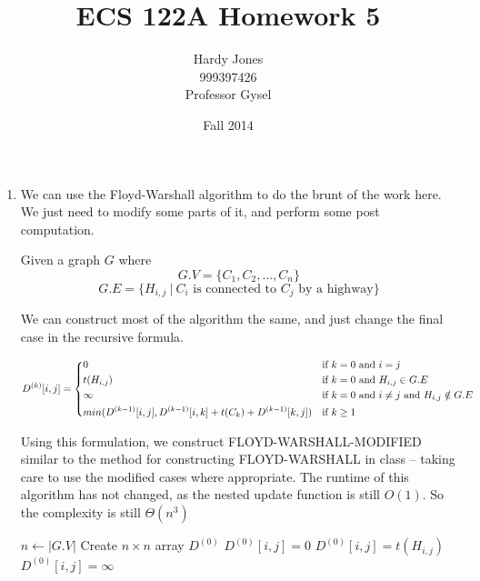 \documentclass[12pt,letterpaper]{article}
\title{ECS 122A Homework 5\vspace{-2ex}}
\author{Hardy Jones\\
        999397426\\
        Professor Gysel\vspace{-2ex}}
\date{Fall 2014}
\begin{document}
  \maketitle

  \begin{enumerate}
    \item
      We can use the Floyd-Warshall algorithm to do the brunt of the work here.
      We just need to modify some parts of it, and perform some post computation.

      Given a graph $G$ where
      \[
        G.V = \{C_1, C_2, \dots, C_n\}
      \]
      \[
        G.E = \{H_{i, j} \ | \ C_i \text{ is connected to } C_j \text{ by a highway}\}
      \]

      We can construct most of the algorithm the same,
      and just change the final case in the recursive formula.


      \[
        D^{(k)}[i, j] =
        \begin{dcases*}
          0           & if $k = 0$ and $i = j$ \\
          t(H_{i, j}) & if $k = 0$ and $H_{i, j} \in G.E$ \\
          \infty      & if $k = 0$ and $i \ne j$ and $H_{i, j} \notin G.E$ \\
          min(D^{(k-1)}[i, j], D^{(k-1)}[i, k] + t(C_k) + D^{(k-1)}[k, j]) & if $k \ge 1$
        \end{dcases*}
      \]

      Using this formulation, we construct FLOYD-WARSHALL-MODIFIED similar to the method for constructing FLOYD-WARSHALL in class -- taking care to use the modified cases where appropriate.
      The runtime of this algorithm has not changed, as the nested update function is still $O(1)$.
      So the complexity is still $\Theta(n^3)$

      \pagebreak

      \begin{algorithm}
        \begin{algorithmic}
            \State $n \gets |G.V|$
            \State Create $n \times n$ array $D^{(0)}$
                  \State $D^{(0)}[i, j] = 0$
                  \State $D^{(0)}[i, j] = t(H_{i, j})$
                \Else
                  \State $D^{(0)}[i, j] = \infty$
                \EndIf
              \EndFor
            \EndFor


\end{algorithmic}
\end{algorithm}
\end{enumerate}
\end{document}
